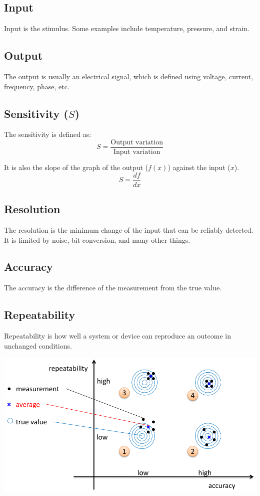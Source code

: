 \documentclass[11pt]{article}
\begin{document}
\subsection{Input}
\label{sec:orgd4100e0}
Input is the stimulus. Some examples include temperature, pressure, and strain.
\subsection{Output}
\label{sec:org69a7894}
The output is usually an electrical signal, which is defined using voltage, current, frequency, phase, etc.
\subsection{Sensitivity (\(S\))}
\label{sec:org947b0ff}
The sensitivity is defined as:
\[S = \frac{\text{Output variation}}{\text{Input variation}}\]

It is also the slope of the graph of the output (\(f(x)\)) against the input (\(x\)).
\[S = \frac{df}{dx}\]
\subsection{Resolution}
\label{sec:org1f68416}
The resolution is the minimum change of the input that can be reliably detected. It is limited by noise, bit-conversion, and many other things.
\subsection{Accuracy}
\label{sec:org17e54cd}
The accuracy is the difference of the measurement from the true value.

 \newpage
\subsection{Repeatability}
\label{sec:org36f06a9}
Repeatability is how well a system or device can reproduce an outcome in unchanged conditions.

\begin{center}
\includegraphics[width=.9\linewidth]{./images/repeatability-and-accuracy.png}
\end{center}
\end{document}
